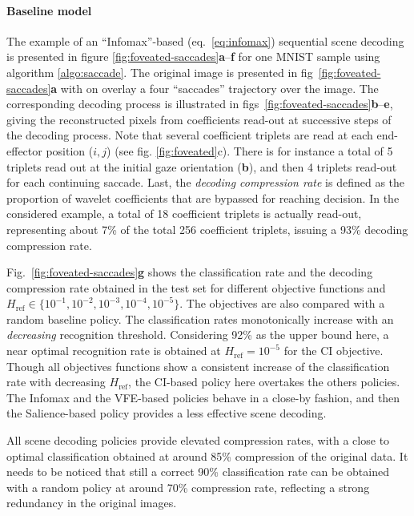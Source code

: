 \documentclass[12pt,twoside,openright]{article}
\begin{document}
\paragraph{Baseline model}
The example of an ``Infomax''-based (eq.~\ref{eq:infomax}) sequential scene decoding is presented in figure \ref{fig:foveated-saccades}\textbf{a}--\textbf{f} for one MNIST sample using algorithm \ref{algo:saccade}.
The original image is presented in fig~\ref{fig:foveated-saccades}\textbf{a} with on overlay a four ``saccades'' trajectory over the image. The corresponding decoding process is illustrated in figs~\ref{fig:foveated-saccades}\textbf{b}--\textbf{e}, giving the reconstructed pixels from  coefficients read-out at successive steps of the decoding process.
Note that several coefficient triplets are read at each end-effector position ($i,j$) (see fig. \ref{fig:foveated}c). There is for instance a total of 5 triplets read out at the initial gaze orientation (\textbf{b}), and then 4 triplets read-out for each continuing saccade. 
Last, the \emph{decoding compression rate} is defined as the proportion of wavelet coefficients that are bypassed for reaching decision. In the considered example, a total of 18 coefficient triplets is  actually read-out, representing about 7\% of the total 256 coefficient triplets, issuing a 93\% decoding compression rate. 

Fig.~\ref{fig:foveated-saccades}\textbf{g} shows the classification rate and the decoding compression rate  obtained in the test set for different objective functions and $H_\text{ref} \in \{10^{-1}, 10^{-2}, 10^{-3}, 10^{-4}, 10^{-5}\}$. The objectives are also compared with a random baseline policy. The classification rates monotonically increase with an \emph{decreasing} recognition threshold. Considering 92\% as the upper bound here, a near optimal recognition rate is obtained  at $H_\text{ref}=10^{-5}$ for the CI objective. Though all objectives functions show a consistent increase of the classification rate with decreasing $H_\text{ref}$, the CI{\color{Purple}-based policy} here overtakes the others {\color{Purple}policies}. The Infomax and the VFE{\color{Purple}-based policies} behave in a close-by fashion, and then the Salience{\color{Purple}-based policy} {\color{Purple} provides a less effective scene decoding}. 

{\color{Purple} All scene decoding policies provide elevated} compression rates, with a close to optimal classification obtained at around 85\% compression of the original data. It needs to be noticed that still a correct 90\% classification rate can be obtained with a random {\color{Purple} policy} at around 70\% compression rate, reflecting a strong redundancy in the original images.  
\end{document}
